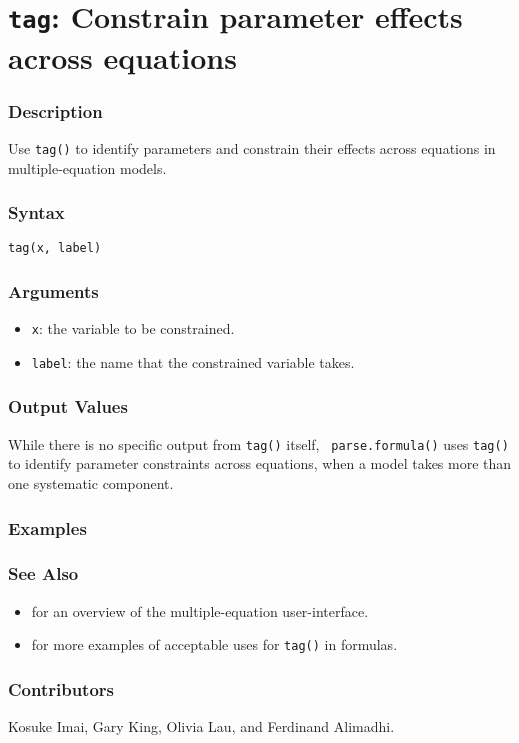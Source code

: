\section{{\tt tag}: Constrain parameter effects across equations}
\label{tag}

\subsubsection{Description}
Use {\tt tag()} to identify parameters and constrain their effects
across equations in multiple-equation models.  
  
\subsubsection{Syntax}
\begin{verbatim}
tag(x, label)
\end{verbatim}

\subsubsection{Arguments}
\begin{itemize}
\item {\tt x}: the variable to be constrained.
\item {\tt label}: the name that the constrained variable takes.  
\end{itemize}

\subsubsection{Output Values}
While there is no specific output from {\tt tag()} itself, {\tt
parse.formula()} uses {\tt tag()} to identify parameter constraints
across equations, when a model takes more than one systematic
component.  

\subsubsection{Examples}

\subsubsection{See Also}
\begin{itemize}
\item {} for an overview of the multiple-equation user-interface.
\item {} for more examples of acceptable uses for
{\tt tag()} in formulas.  
\end{itemize}

\subsubsection{Contributors}

Kosuke Imai, Gary King, Olivia Lau, and Ferdinand Alimadhi.















